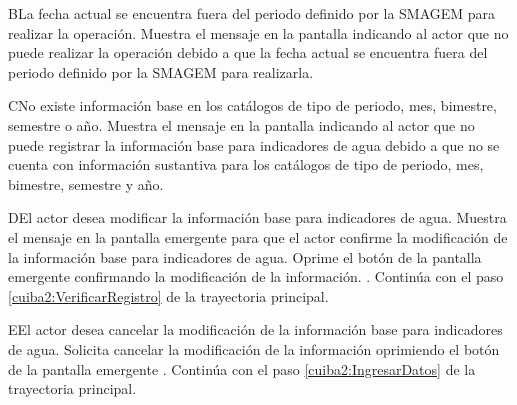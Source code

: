    \begin{UCtrayectoriaA}{B}{La fecha actual se encuentra fuera del periodo definido por la SMAGEM para realizar la operación.}
    \UCpaso[\UCsist] Muestra el mensaje  en la pantalla  indicando al actor que no puede realizar la operación debido a que la fecha actual se encuentra fuera del periodo definido por la SMAGEM para realizarla. 
 \end{UCtrayectoriaA}
 
  \begin{UCtrayectoriaA}{C}{No existe información base en los catálogos de tipo de periodo, mes, bimestre, semestre o año.}
    \UCpaso[\UCsist] Muestra el mensaje  en la pantalla  indicando al actor que no puede registrar la información base para indicadores de agua debido a que no se cuenta con información sustantiva para los catálogos de tipo de periodo, mes, bimestre, semestre y año.
 \end{UCtrayectoriaA}
 
  \begin{UCtrayectoriaA}{D}{El actor desea modificar la información base para indicadores de agua.}
    \UCpaso[\UCsist] Muestra el mensaje  en la pantalla emergente  para que el actor confirme la modificación de la información base para indicadores de agua.
    \UCpaso[\UCactor] Oprime el botón  de la pantalla emergente  confirmando la modificación de la información. .
    \UCpaso[] Continúa con el paso \ref{cuiba2:VerificarRegistro} de la trayectoria principal.    
 \end{UCtrayectoriaA}
 
   \begin{UCtrayectoriaA}{E}{El actor desea cancelar la modificación de la información base para indicadores de agua.}
    \UCpaso[\UCactor] Solicita cancelar la modificación de la información oprimiendo el botón  de la pantalla emergente .
    \UCpaso[] Continúa con el paso \ref{cuiba2:IngresarDatos} de la trayectoria principal.    
 \end{UCtrayectoriaA}
 
